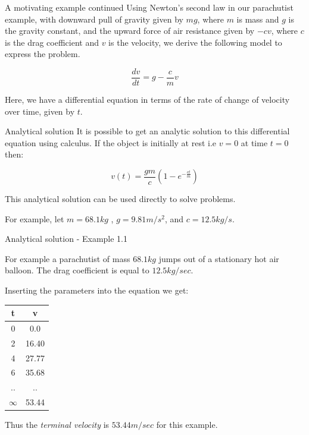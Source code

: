 \documentclass[12pt]{beamer}
\begin{document}
\begin{frame}{A motivating example continued}
Using Newton's second law in our parachutist example, with downward pull of gravity given by $mg$, where $m$ is mass and $g$ is the gravity constant, and the upward force of air resistance given by $-cv$, where $c$ is the drag coefficient and $v$ is the velocity, we derive the following model to express the problem.

\[
\frac{dv}{dt}=g-\frac{c}{m}v
\]

Here, we have a differential equation in terms of the rate of change of velocity over time, given by $t$.
\vspace{2 in}
\end{frame}

\begin{frame}{Analytical solution} 
It is possible to get an
analytic solution to this differential equation using calculus. If the 
object is initially at rest i.e $v = 0$ at time $t = 0$ then: 

\begin{equation} 
v(t) = \frac{gm}{c} (1 - e^{-\frac{ct}{m}})
\end{equation} 


This analytical solution can be used directly to solve
problems. 

\vspace{0.25 in}

For example, let  $m=68.1 kg$ , $g=9.81 m/s^2$, and $c=12.5 kg/s$.

\end{frame} 

\begin{frame}{Analytical solution - Example 1.1}

For example a parachutist of mass $68.1 kg$ jumps out of a stationary hot
air balloon. The drag coefficient is equal to $12.5 kg/sec$. 

Inserting the parameters into the equation we get: 

\begin{table} 
\begin{tabular}{|c|c|} 
\hline
{\bf t}    & {\bf v} \\ 
\hline 
0   &  0.0 \\ 
2   &  16.40 \\ 
4   &  27.77 \\ 
6   &  35.68  \\
..   &  ..  \\
$\infty$ & 53.44 \\ 
\hline
\end{tabular}
\end{table} 
  

Thus the {\it terminal velocity} is $53.44 m/sec$ for this example. 
 
\end{frame} 
\end{document}
